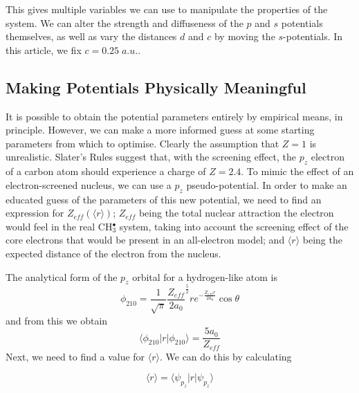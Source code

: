 \documentclass[journal=jctcce,manuscript=article]{achemso}
\begin{document}
This gives multiple variables we can use to manipulate the properties of the system.
We can alter the strength and diffuseness of the \(p\) and \(s\) potentials themselves,
as well as vary the distances \(d\) and \(c\) by moving the \(s\)-potentials.
In this article, we fix \(c = 0.25\;a.u.\).

\subsection{Making Potentials Physically Meaningful}
\label{section:potential_derivation}

It is possible to obtain the potential parameters entirely by empirical means, in principle. However, we can make a more informed guess at some starting parameters from which to optimise. Clearly the assumption that \(Z = 1\) is unrealistic. Slater's Rules\cite{slatersrules} suggest that, with the screening effect, the \(p_{z}\) electron of a carbon atom should experience a charge of \(Z = 2.4\). To mimic the effect of an electron-screened nucleus, we can use a \(p_{z}\) pseudo-potential. In order to make an educated guess of the parameters of this new potential, we need to find an expression for \(Z_{eff}(\langle r \rangle)\); \(Z_{eff}\) being the total nuclear attraction the electron would feel in the real CH\(^{\bullet}_{3}\) system, taking into account the screening effect of the core electrons that would be present in an all-electron model; and \( \langle r \rangle \) being the expected distance of the electron from the nucleus.

The analytical form of the \(p_{z}\) orbital for a hydrogen-like atom is\cite{nyu_h_solutions}
\begin{equation}
\phi_{210} = \frac{1}{\sqrt{\pi}} \frac{Z_{eff}}{2a_{0}} ^{\frac{5}{2}} re^{-\frac{Z_{eff}r}{2a_{0}}} \cos \theta
\end{equation}
and from this we obtain 
\begin{equation}
\label{equation:PsirPsi}
\langle \phi_{210} | r | \phi_{210} \rangle = \frac{5a_{0}}{Z_{eff}}
\end{equation}
Next, we need to find a value for \( \langle r \rangle \). We can do this by calculating

\begin{equation}
\langle r \rangle = \langle \psi_{p_{z}} | r | \psi_{p_{z}} \rangle
\label{equation:exp_r}
\end{equation}
\end{document}
